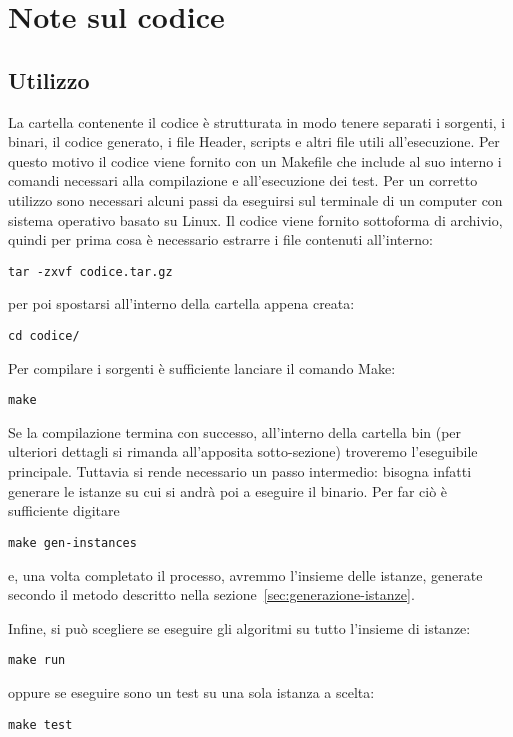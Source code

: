 
\section{Note sul codice}\label{sec:codice}
\subsection{Utilizzo}\label{subsec:utilizzo}
La cartella contenente il codice è strutturata in modo tenere separati i sorgenti, i binari, il codice generato,
i file Header, scripts e altri file utili all'esecuzione.
Per questo motivo il codice viene fornito con un \textsf{Makefile} che include al suo interno i comandi
necessari alla compilazione e all'esecuzione dei test.
Per un corretto utilizzo sono necessari alcuni passi da eseguirsi sul terminale di un computer con sistema
operativo basato su Linux.
%
Il codice viene fornito sottoforma di archivio, quindi per prima cosa è necessario estrarre
i file contenuti all'interno:
\label{code:make-passo-1}
\begin{lstlisting}[style=BashStyle]
tar -zxvf codice.tar.gz
\end{lstlisting}
per poi spostarsi all'interno della cartella appena creata:
\label{code:make-passo-2}
\begin{lstlisting}[style=BashStyle]
cd codice/
\end{lstlisting}
%
Per compilare i sorgenti è sufficiente lanciare il comando \textsf{Make}:
\label{code:make-passo-3}
\begin{lstlisting}[style=BashStyle]
make
\end{lstlisting}
%
Se la compilazione termina con successo, all'interno della
cartella \textsf{bin} (per ulteriori dettagli si rimanda all'apposita sotto-sezione) troveremo
l'eseguibile principale.
Tuttavia si rende necessario un passo intermedio: bisogna infatti generare le istanze su cui si andrà
poi a eseguire il binario.
Per far ciò è sufficiente digitare
\label{code:make-passo-4}
\begin{lstlisting}[style=BashStyle]
make gen-instances
\end{lstlisting}
e, una volta completato il processo, avremmo l'insieme delle istanze, generate secondo il metodo
descritto nella sezione~\ref{sec:generazione-istanze}.

Infine, si può scegliere se eseguire gli algoritmi su tutto l'insieme di istanze:
\label{code:make-passo-5}
\begin{lstlisting}[style=BashStyle]
make run
\end{lstlisting}
oppure se eseguire sono un test su una sola istanza a scelta:
\label{code:make-passo-6}
\begin{lstlisting}[style=BashStyle]
make test
\end{lstlisting}
